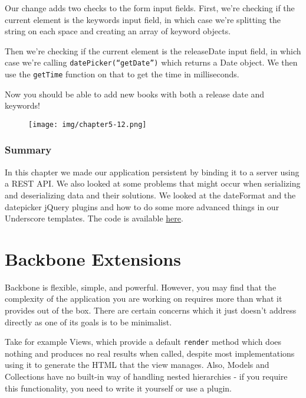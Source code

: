 \documentclass[9pt]{book}
\begin{document}
Our change adds two checks to the form input fields. First, we're
checking if the current element is the keywords input field, in which
case we're splitting the string on each space and creating an array of
keyword objects.

Then we're checking if the current element is the releaseDate input
field, in which case we're calling \texttt{datePicker(“getDate”)} which
returns a Date object. We then use the \texttt{getTime} function on that
to get the time in milliseconds.

Now you should be able to add new books with both a release date and
keywords!

\begin{figure}[htbp]
\centering
\texttt{[image: img/chapter5-12.png]}
\end{figure}

\subsubsection{Summary}\label{summary-3}

In this chapter we made our application persistent by binding it to a
server using a REST API. We also looked at some problems that might
occur when serializing and deserializing data and their solutions. We
looked at the dateFormat and the datepicker jQuery plugins and how to do
some more advanced things in our Underscore templates. The code is
available
\href{https://github.com/addyosmani/backbone-fundamentals/tree/gh-pages/practicals/exercise-2}{here}.

\section{Backbone Extensions}\label{backbone-extensions}

Backbone is flexible, simple, and powerful. However, you may find that
the complexity of the application you are working on requires more than
what it provides out of the box. There are certain concerns which it
just doesn't address directly as one of its goals is to be minimalist.

Take for example Views, which provide a default \texttt{render} method
which does nothing and produces no real results when called, despite
most implementations using it to generate the HTML that the view
manages. Also, Models and Collections have no built-in way of handling
nested hierarchies - if you require this functionality, you need to
write it yourself or use a plugin.
\end{document}
